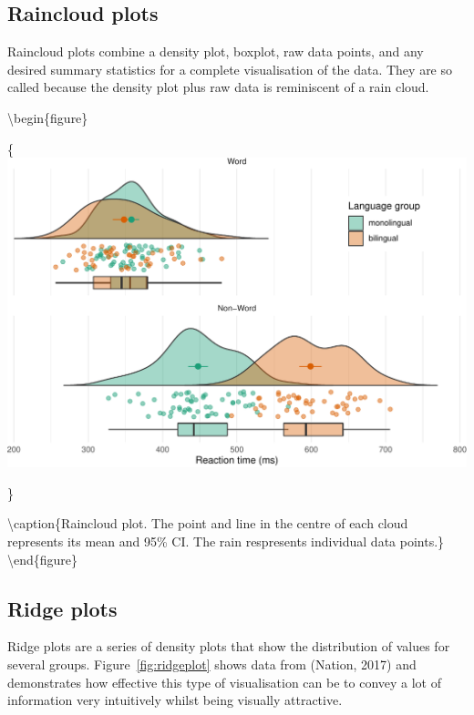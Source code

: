 \documentclass[
  english,
  doc,floatsintext]{apa6}
\begin{document}
\hypertarget{raincloud-plots}{%
\subsection{Raincloud plots}\label{raincloud-plots}}

Raincloud plots combine a density plot, boxplot, raw data points, and any desired summary statistics for a complete visualisation of the data. They are so called because the density plot plus raw data is reminiscent of a rain cloud.

\textbackslash begin\{figure\}

\{\centering \includegraphics[width=1\linewidth]{images/raincloud-1}

\}

\textbackslash caption\{Raincloud plot. The point and line in the centre of each cloud represents its mean and 95\% CI. The rain respresents individual data points.\}\label{fig:raincloud}
\textbackslash end\{figure\}

\hypertarget{ridge-plots}{%
\subsection{Ridge plots}\label{ridge-plots}}

Ridge plots are a series of density plots that show the distribution of values for several groups. Figure~\ref{fig:ridgeplot} shows data from (Nation, 2017) and demonstrates how effective this type of visualisation can be to convey a lot of information very intuitively whilst being visually attractive.
\end{document}
